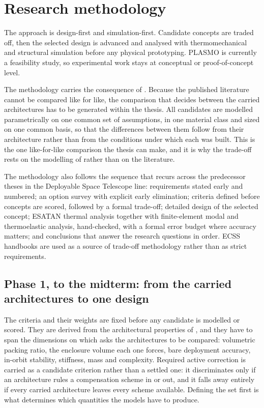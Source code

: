 \chapter{Research methodology}
\label{chapter:methodology}

The approach is design-first and simulation-first. Candidate concepts are traded off, then the selected design is advanced and analysed with thermomechanical and structural simulation before any physical prototyping. PLASMO is currently a feasibility study, so experimental work stays at conceptual or proof-of-concept level.

The methodology carries the consequence of . Because the published literature cannot be compared like for like, the comparison that decides between the carried architectures has to be generated within the thesis. All candidates are modelled parametrically on one common set of assumptions, in one material class and sized on one common basis, so that the differences between them follow from their architecture rather than from the conditions under which each was built. This is the one like-for-like comparison the thesis can make, and it is why the trade-off rests on the modelling of  rather than on the literature.

The methodology also follows the sequence that recurs across the predecessor theses in the Deployable Space Telescope line: requirements stated early and numbered; an option survey with explicit early elimination; criteria defined before concepts are scored, followed by a formal trade-off; detailed design of the selected concept; ESATAN thermal analysis together with finite-element modal and thermoelastic analysis, hand-checked, with a formal error budget where accuracy matters; and conclusions that answer the research questions in order. ECSS handbooks are used as a source of trade-off methodology rather than as strict requirements.

\section{Phase 1, to the midterm: from the carried architectures to one design}
\label{sec:phase1}

 The criteria and their weights are fixed before any candidate is modelled or scored. They are derived from the architectural properties of , and they have to span the dimensions on which  asks the architectures to be compared: volumetric packing ratio, the enclosure volume each one forces, bare deployment accuracy, in-orbit stability, stiffness, mass and complexity. Required active correction is carried as a candidate criterion rather than a settled one: it discriminates only if an architecture rules a compensation scheme in or out, and it falls away entirely if every carried architecture leaves every scheme available. Defining the set first is what determines which quantities the models have to produce.

